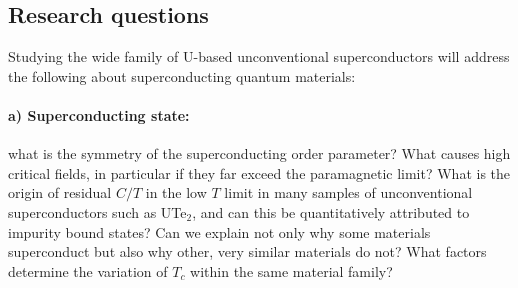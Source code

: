 \subsection*{Research questions}
\noindent



Studying the wide family of U-based unconventional superconductors will address the following   about superconducting quantum materials:

\paragraph {a) Superconducting state:} what is the symmetry of the superconducting order parameter? What causes high critical fields, in particular if they far exceed the paramagnetic limit? %
What is the origin of residual $C/T$ in the low $T$ limit in many samples of unconventional superconductors such as UTe$_2$, and can this be quantitatively attributed to impurity bound states? 
Can we explain not only why some materials superconduct but also why other, very similar materials do not? What factors determine the variation of $T_c$ within the same material family? 


